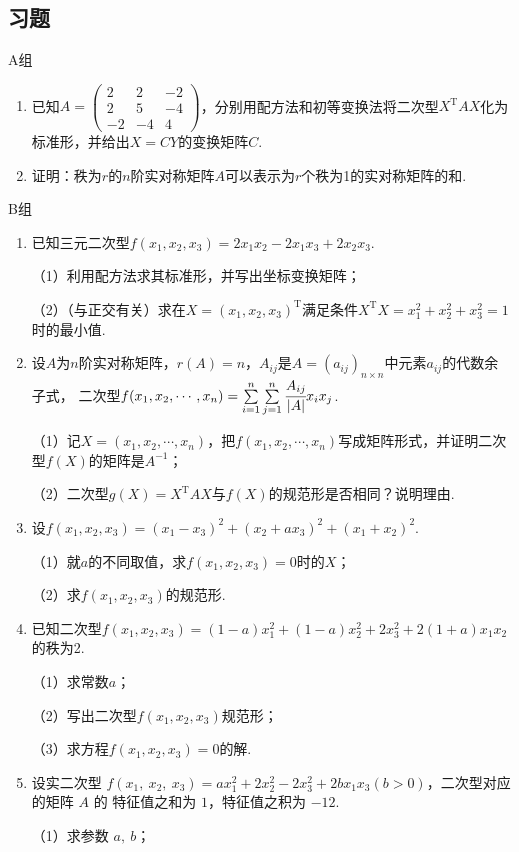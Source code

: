 \subsection{习题}
\centerline{\heiti A组}
\begin{enumerate}
	\item 已知$A=\begin{pmatrix}
		2 & 2 & -2 \\ 2 & 5 & -4 \\ -2 & -4 & 4
	\end{pmatrix}$，分别用配方法和初等变换法将二次型$X^\mathrm{T}AX$化为标准形，并给出$X=CY$的变换矩阵$C$.
	\item 证明：秩为$r$的$n$阶实对称矩阵$A$可以表示为$r$个秩为1的实对称矩阵的和.
\end{enumerate}
\centerline{\heiti B组}
\begin{enumerate}
	\item 已知三元二次型$f(x_1,x_2,x_3)=2x_1x_2-2x_1x_3+2x_2x_3$.
	
	（1）利用配方法求其标准形，并写出坐标变换矩阵；
	
	（2）（与正交有关）求在$X=(x_1,x_2,x_3)^\mathrm{T}$满足条件$X^\mathrm{T}X=x_1^2+x_2^2+x_3^2=1$时的最小值.
	\item 设$A$为$n$阶实对称矩阵，$r(A)=n$，$A_{ij}$是$A=(a_{ij})_{n\times n}$中元素$a_{ij}$的代数余子式，
	二次型$f(x_1,x_2,\cdots,x_n)=\sum\limits_{i=1}^{n}\sum\limits_{j=1}^{n}\cfrac{A_{ij}}{|A|}x_ix_j$.

	（1）记$X=(x_1,x_2,\cdots,x_n)$，把$f(x_1,x_2,\cdots,x_n)$写成矩阵形式，并证明二次型$f(X)$的矩阵是$A^{-1}$；

	（2）二次型$g(X)=X^\mathrm{T}AX$与$f(X)$的规范形是否相同？说明理由.
	\item 设$f(x_1,x_2,x_3)=(x_1-x_3)^2+(x_2+ax_3)^2+(x_1+x_2)^2$.
	
	（1）就$a$的不同取值，求$f(x_1,x_2,x_3)=0$时的$X$；

	（2）求$f(x_1,x_2,x_3)$的规范形.
	\item 已知二次型$f(x_1,x_2,x_3)=(1-a)x_1^2+(1-a)x_2^2+2x_3^2+2(1+a)x_1x_2$的秩为2.
	
	（1）求常数$a$；

	（2）写出二次型$f(x_1,x_2,x_3)$规范形；

	（3）求方程$f(x_1,x_2,x_3)=0$的解.
	\item 设实二次型 $f(x_1,\ x_2,\ x_3)=ax_1^2+2x_2^2-2x_3^2+2bx_1x_3(b > 0)$，二次型对应的矩阵 $A$ 的
	特征值之和为 $1$，特征值之积为 $-12$.

	（1）求参数 $a,\ b$；


\end{enumerate}
